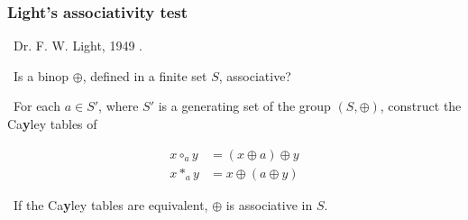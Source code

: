 \begin{frame}[plain]

\frametitle{Light's associativity test}

\bi\ Dr. F. W. Light, 1949 \cite{light}.

\bi\ Is a binop $\oplus$, defined in a finite set $S$, associative?

\bi\ For each $a\in S'$, where $S'$ is a generating set of the group
$\left(S,\oplus\right)$, construct the Ca\textbf{y}ley tables of

\begin{align*}
x \circ_{a} y   &= (x \oplus a) \oplus y \\
x *_{a} y       &= x \oplus (a \oplus y) 
\end{align*}

\bi\ If the Ca\textbf{y}ley tables are equivalent, $\oplus$ is associative in
$S$.

\end{frame}

